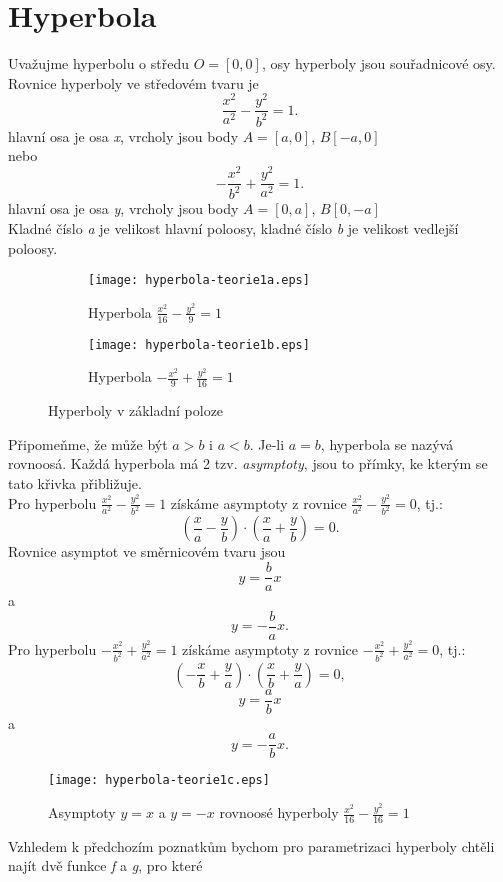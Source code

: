 		\section{Hyperbola}
		Uvažujme hyperbolu o středu $O=[0,0]$, osy hyperboly jsou souřadnicové osy. Rovnice hyperboly ve středovém tvaru je
		$$\frac{x^2}{a^2}-\frac{y^2}{b^2}=1.$$
		hlavní osa je osa \textit{x}, vrcholy jsou body $A=[a, 0]$, $B[-a, 0]$ \\
		nebo
		$$-\frac{x^2}{b^2}+\frac{y^2}{a^2}=1.$$
		hlavní osa je osa \textit{y}, vrcholy jsou body $A=[0, a]$, $B[0, -a]$ \\[10pt]
			Kladné číslo \textit{a} je velikost hlavní poloosy, kladné číslo \textit{b} je velikost vedlejší poloosy.
			\begin{figure}[H]
				\centering
				\begin{subfigure}{0.5\textwidth}
					\centering
					\texttt{[image: hyperbola-teorie1a.eps]}
					\caption{Hyperbola $\frac{x^2}{16}-\frac{y^2}{9}=1$}
				\end{subfigure}%
				\begin{subfigure}{0.5\textwidth}
					\centering
					\texttt{[image: hyperbola-teorie1b.eps]}
					\caption{Hyperbola $-\frac{x^2}{9}+\frac{y^2}{16}=1$}
				\end{subfigure}
				\caption{Hyperboly v základní poloze}
			\end{figure}
			Připomeňme, že může být $a>b$ i $a<b$. Je-li $a=b$, hyperbola se nazývá rovnoosá. Každá hyperbola má 2 tzv. \textit{asymptoty},
			jsou to přímky, ke kterým se tato křivka přibližuje. \\[10pt]
			Pro hyperbolu $\frac{x^2}{a^2}-\frac{y^2}{b^2}=1$ získáme asymptoty z rovnice $\frac{x^2}{a^2}-\frac{y^2}{b^2}=0$, tj.:
			$$\left(\frac{x}{a}-\frac{y}{b}\right)\cdot\left(\frac{x}{a}+\frac{y}{b}\right)=0.$$
			Rovnice asymptot ve směrnicovém tvaru jsou
			$$y=\frac{b}{a}x$$
			a
			$$y=-\frac{b}{a}x.$$
			Pro hyperbolu $-\frac{x^2}{b^2}+\frac{y^2}{a^2}=1$ získáme asymptoty z rovnice $-\frac{x^2}{b^2}+\frac{y^2}{a^2}=0$, tj.:
			$$\left(-\frac{x}{b}+\frac{y}{a}\right)\cdot\left(\frac{x}{b}+\frac{y}{a}\right)=0,$$
			$$y=\frac{a}{b}x$$
			a
			$$y=-\frac{a}{b}x.$$
			\begin{figure}[H]
				\centering
				\texttt{[image: hyperbola-teorie1c.eps]}
				\caption{Asymptoty $y=x$ a $y=-x$ rovnoosé hyperboly $\frac{x^2}{16}-\frac{y^2}{16}=1$}					
			\end{figure}
			Vzhledem k předchozím poznatkům bychom pro parametrizaci hyperboly chtěli najít dvě funkce \textit{f} a \textit{g}, pro které
